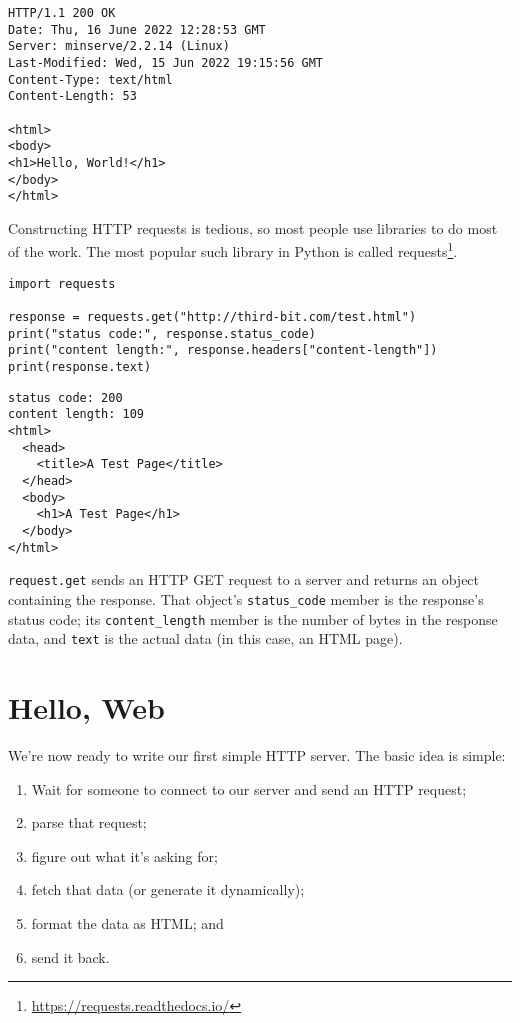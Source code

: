 \documentclass{scrbook}
\newcommand{\hreffoot}[2]{{#1}\footnote{\href{#2}{#2}}}
\begin{document}
\begin{lstlisting}[frame=single,frameround=tttt]
HTTP/1.1 200 OK
Date: Thu, 16 June 2022 12:28:53 GMT
Server: minserve/2.2.14 (Linux)
Last-Modified: Wed, 15 Jun 2022 19:15:56 GMT
Content-Type: text/html
Content-Length: 53

<html>
<body>
<h1>Hello, World!</h1>
</body>
</html>
\end{lstlisting}


Constructing HTTP requests is tedious,
so most people use libraries to do most of the work.
The most popular such library in Python is called \hreffoot{requests}{https://requests.readthedocs.io/}.


\begin{lstlisting}[frame=single,frameround=tttt]
import requests

response = requests.get("http://third-bit.com/test.html")
print("status code:", response.status_code)
print("content length:", response.headers["content-length"])
print(response.text)
\end{lstlisting}



\begin{lstlisting}[frame=single,frameround=tttt]
status code: 200
content length: 109
<html>
  <head>
    <title>A Test Page</title>
  </head>
  <body>
    <h1>A Test Page</h1>
  </body>
</html>
\end{lstlisting}



\texttt{request.get} sends an HTTP GET request to a server
and returns an object containing the response.
That object's \texttt{status\_code} member is the response's status code;
its \texttt{content\_length} member  is the number of bytes in the response data,
and \texttt{text} is the actual data
(in this case, an HTML page).

\section{Hello, Web}\label{server-static}


We're now ready to write our first simple HTTP server.
The basic idea is simple:

\begin{enumerate}

\item Wait for someone to connect to our server and send an HTTP request;

\item parse that request;

\item figure out what it's asking for;

\item fetch that data (or generate it dynamically);

\item format the data as HTML; and

\item send it back.

\end{enumerate}
\end{document}
